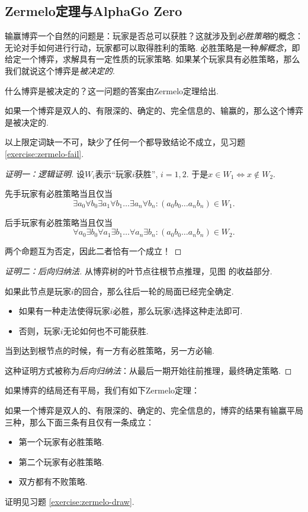 \subsection{Zermelo定理与AlphaGo Zero}

输赢博弈一个自然的问题是：玩家是否总可以获胜？这就涉及到\textit{必胜策略}的概念：无论对手如何进行行动，玩家都可以取得胜利的策略. 必胜策略是一种\textit{解概念}，即给定一个博弈，求解具有一定性质的玩家策略. 如果某个玩家具有必胜策略，那么我们就说这个博弈是\textit{被决定的}. 

什么博弈是被决定的？这一问题的答案由Zermelo定理给出.

\begin{theorem}\label{thm:zermelo}
如果一个博弈是双人的、有限深的、确定的、完全信息的、输赢的，那么这个博弈是被决定的.
\end{theorem}
以上限定词缺一不可，缺少了任何一个都导致结论不成立，见习题 \ref{exercise:zermelo-fail}.

\begin{proof}[证明一：逻辑证明]
设$W_i$表示“玩家$i$获胜”, $i=1,2$. 于是$x\in W_1\iff x\not\in W_2$.

先手玩家有必胜策略当且仅当
\[\exists a_0\forall b_0\exists a_1\forall b_1\dots\exists a_n\forall b_n: (a_0b_0\dots a_nb_n)\in W_1.\]

后手玩家有必胜策略当且仅当
\[\forall a_0\exists b_0\forall a_1\exists b_1\dots\forall a_n\exists b_n: (a_0b_0\dots a_nb_n)\in W_2.\]

两个命题互为否定，因此二者恰有一个成立！
\end{proof}

\begin{proof}[证明二：后向归纳法]
从博弈树的叶节点往根节点推理，见图 的收益部分. 

如果此节点是玩家$i$的回合，那么往后一轮的局面已经完全确定.
\begin{itemize}
    \item 如果有一种走法使得玩家$i$必胜，那么玩家$i$选择这种走法即可.
    \item 否则，玩家$i$无论如何也不可能获胜.
\end{itemize}

当到达到根节点的时候，有一方有必胜策略，另一方必输.

这种证明方式被称为\textit{后向归纳法}：从最后一期开始往前推理，最终确定策略.
\end{proof}

如果博弈的结局还有平局，我们有如下Zermelo定理：
\begin{theorem}[有平局的Zermelo定理]\label{thm:zermelo-draw}
如果一个博弈是双人的、有限深的、确定的、完全信息的，博弈的结果有输赢平局三种，那么下面三条有且仅有一条成立：
\begin{itemize}
    \item 第一个玩家有必胜策略.
    \item 第二个玩家有必胜策略.
    \item 双方都有不败策略.
\end{itemize}
\end{theorem}
证明见习题 \ref{exercise:zermelo-draw}.

